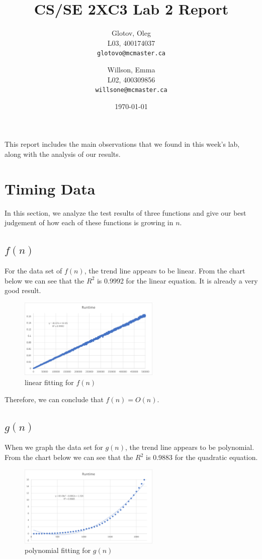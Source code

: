 \documentclass[12pt]{article}
\title{CS/SE 2XC3 Lab 2 Report}
\author{
  Glotov, Oleg\\ L03, 400174037\\
  \texttt{glotovo@mcmaster.ca}
  \and
  Willson, Emma\\ L02, 400309856\\
  \texttt{willsone@mcmaster.ca}
  }
\date{\today}
\begin{document}
\maketitle

This report includes the main observations that we found in this week's lab, along with the analysis of our results.

\newpage 
\section{Timing Data}
In this section, we analyze the test results of three functions and give our best judgement of how each of these functions is growing in $n$.
\subsection{\(f(n)\)}
For the data set of $f(n)$, the trend line appears to be linear. From the chart below we can see that the $R^2$ is 0.9992 for the linear equation. It is already a very good result.

\begin{figure}[h!]
\centering
\includegraphics[width=0.6\textwidth,height=\textheight,keepaspectratio]{fn_Tn}
\caption{linear fitting for $f(n)$}
\label{Figure: fn_1}
\end{figure}
\noindent Therefore, we can conclude that $f(n) = O(n)$. 

\subsection{\(g(n)\)}
When we graph the data set for $g(n)$, the trend line appears to be polynomial. From the chart below we can see that the $R^2$ is 0.9883 for the quadratic equation. 

\begin{figure}[H]
\centering
\includegraphics[width=0.6\textwidth,height=\textheight,keepaspectratio]{gn_Tn}
\caption{polynomial fitting for $g(n)$}
\label{Figure: gn_1}
\end{figure}
\end{document}
